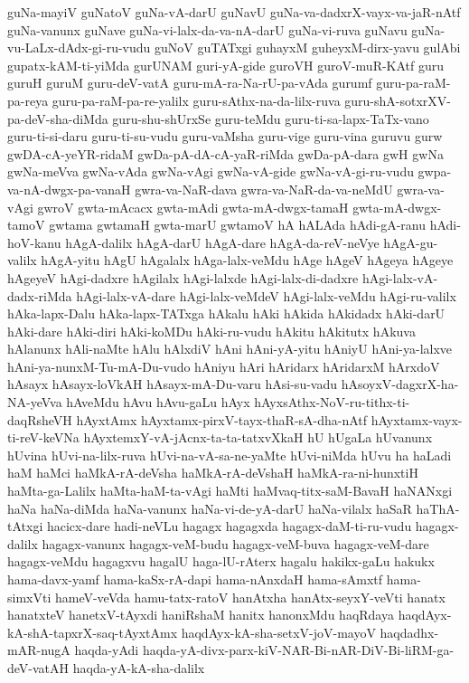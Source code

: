 {guNa-mayiV
guNatoV
guNa-vA-darU
guNavU
guNa-va-dadxrX-vayx-va-jaR-nAtf
guNa-vanunx
guNave
guNa-vi-lalx-da-va-nA-darU
guNa-vi-ruva
guNavu
guNa-vu-LaLx-dAdx-gi-ru-vudu
guNoV
guTATxgi
guhayxM
guheyxM-dirx-yavu
gulAbi
gupatx-kAM-ti-yiMda
gurUNAM
guri-yA-gide
guroVH
guroV-muR-KAtf
guru
guruH
guruM
guru-deV-vatA
guru-mA-ra-Na-rU-pa-vAda
gurumf
guru-pa-raM-pa-reya
guru-pa-raM-pa-re-yalilx
guru-sAthx-na-da-lilx-ruva
guru-shA-sotxrXV-pa-deV-sha-diMda
guru-shu-shUrxSe
guru-teMdu
guru-ti-sa-lapx-TaTx-vano
guru-ti-si-daru
guru-ti-su-vudu
guru-vaMsha
guru-vige
guru-vina
guruvu
gurw
gwDA-cA-yeYR-ridaM
gwDa-pA-dA-cA-yaR-riMda
gwDa-pA-dara
gwH
gwNa
gwNa-meVva
gwNa-vAda
gwNa-vAgi
gwNa-vA-gide
gwNa-vA-gi-ru-vudu
gwpa-va-nA-dwgx-pa-vanaH
gwra-va-NaR-dava
gwra-va-NaR-da-va-neMdU
gwra-va-vAgi
gwroV
gwta-mAcacx
gwta-mAdi
gwta-mA-dwgx-tamaH
gwta-mA-dwgx-tamoV
gwtama
gwtamaH
gwta-marU
gwtamoV
hA
hALAda
hAdi-gA-ranu
hAdi-hoV-kanu
hAgA-dalilx
hAgA-darU
hAgA-dare
hAgA-da-reV-neVye
hAgA-gu-valilx
hAgA-yitu
hAgU
hAgalalx
hAga-lalx-veMdu
hAge
hAgeV
hAgeya
hAgeye
hAgeyeV
hAgi-dadxre
hAgilalx
hAgi-lalxde
hAgi-lalx-di-dadxre
hAgi-lalx-vA-dadx-riMda
hAgi-lalx-vA-dare
hAgi-lalx-veMdeV
hAgi-lalx-veMdu
hAgi-ru-valilx
hAka-lapx-Dalu
hAka-lapx-TATxga
hAkalu
hAki
hAkida
hAkidadx
hAki-darU
hAki-dare
hAki-diri
hAki-koMDu
hAki-ru-vudu
hAkitu
hAkitutx
hAkuva
hAlanunx
hAli-naMte
hAlu
hAlxdiV
hAni
hAni-yA-yitu
hAniyU
hAni-ya-lalxve
hAni-ya-nunxM-Tu-mA-Du-vudo
hAniyu
hAri
hAridarx
hAridarxM
hArxdoV
hAsayx
hAsayx-loVkAH
hAsayx-mA-Du-varu
hAsi-su-vadu
hAsoyxV-dagxrX-ha-NA-yeVva
hAveMdu
hAvu
hAvu-gaLu
hAyx
hAyxsAthx-NoV-ru-tithx-ti-daqRsheVH
hAyxtAmx
hAyxtamx-pirxV-tayx-thaR-sA-dha-nAtf
hAyxtamx-vayx-ti-reV-keVNa
hAyxtemxY-vA-jAcnx-ta-ta-tatxvXkaH
hU
hUgaLa
hUvanunx
hUvina
hUvi-na-lilx-ruva
hUvi-na-vA-sa-ne-yaMte
hUvi-niMda
hUvu
ha
haLadi
haM
haMci
haMkA-rA-deVsha
haMkA-rA-deVshaH
haMkA-ra-ni-hunxtiH
haMta-ga-Lalilx
haMta-haM-ta-vAgi
haMti
haMvaq-titx-saM-BavaH
haNANxgi
haNa
haNa-diMda
haNa-vanunx
haNa-vi-de-yA-darU
haNa-vilalx
haSaR
haThA-tAtxgi
hacicx-dare
hadi-neVLu
hagagx
hagagxda
hagagx-daM-ti-ru-vudu
hagagx-dalilx
hagagx-vanunx
hagagx-veM-budu
hagagx-veM-buva
hagagx-veM-dare
hagagx-veMdu
hagagxvu
hagalU
haga-lU-rAterx
hagalu
hakikx-gaLu
hakukx
hama-davx-yamf
hama-kaSx-rA-dapi
hama-nAnxdaH
hama-sAmxtf
hama-simxVti
hameV-veVda
hamu-tatx-ratoV
hanAtxha
hanAtx-seyxY-veVti
hanatx
hanatxteV
hanetxV-tAyxdi
haniRshaM
hanitx
hanonxMdu
haqRdaya
haqdAyx-kA-shA-tapxrX-saq-tAyxtAmx
haqdAyx-kA-sha-setxV-joV-mayoV
haqdadhx-mAR-nugA
haqda-yAdi
haqda-yA-divx-parx-kiV-NAR-Bi-nAR-DiV-Bi-liRM-ga-deV-vatAH
haqda-yA-kA-sha-dalilx
}

